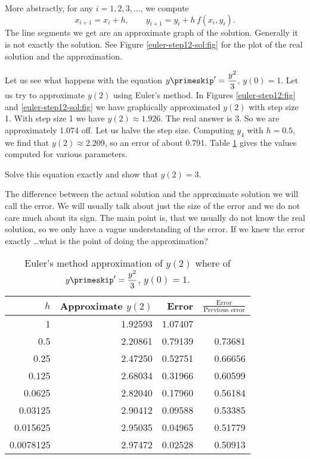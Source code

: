 More abstractly, for any $i=1,2,3,\ldots$, we compute
\begin{equation*}
x_{i+1} = x_i + h , \qquad y_{i+1}  = y_i + h\, f(x_i,y_i) .
\end{equation*}
The line segments we get are an
approximate graph of the solution.
Generally it is not exactly the solution.  See Figure
\ref{euler-step12-sol:fig} for the plot of the real solution
and the approximation.



Let us see what happens with the equation $y\primeskip' = \dfrac{y^2}{3}$, $y(0)=1$.
Let us try
to approximate $y(2)$ using Euler's method.  In
Figures \ref{euler-step12:fig}
and \ref{euler-step12-sol:fig} we have 
graphically approximated $y(2)$ with step size 1.  With step
size 1 we have $y(2) \approx 1.926$.  The real
answer is 3.  So we are approximately 1.074
off.  Let us halve the step size.  Computing $y_4$ with $h=0.5$,
we find that $y(2) \approx 2.209$, so an error of about 0.791.
Table \ref{euler-table:table} gives the values computed
for various parameters.

\medskip

 Solve this equation exactly and show that $y(2) = 3$.

\medskip

The difference between the actual solution and the approximate solution we
will call the error.  We will usually talk about just the size of the error
and we do not care much about its sign.  The main point is, that we usually
do not know the real solution, so we only have a vague understanding of the
error.  If we knew the error exactly \ldots what is the point of doing the
approximation?

\begin{table}[h!t]
\begin{center}
\begin{tabular}{@{}rrrr@{}}
\hline
$h$ & Approximate $y(2)$ & Error & $\frac{\text{Error}}{\text{Previous
error}}$ \\
\hline
1        & 1.92593 & 1.07407 & \\
0.5      & 2.20861 & 0.79139 & 0.73681 \\
0.25     & 2.47250 & 0.52751 & 0.66656 \\
0.125    & 2.68034 & 0.31966 & 0.60599 \\
0.0625   & 2.82040 & 0.17960 & 0.56184 \\
0.03125  & 2.90412 & 0.09588 & 0.53385 \\
0.015625 & 2.95035 & 0.04965 & 0.51779 \\
0.0078125& 2.97472 & 0.02528 & 0.50913 \\
\hline
\end{tabular}
\end{center}
\caption{Euler's method approximation of $y(2)$ where
of $y\primeskip'=\dfrac{y^2}{3}$, $y(0)=1$.\label{euler-table:table}}
\end{table}


